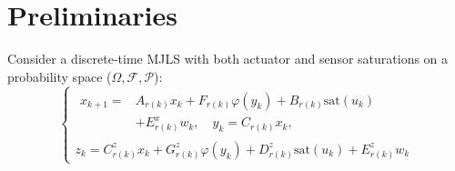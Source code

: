 \documentclass[conference]{IEEEtran}
\begin{document}
%






\section{Preliminaries}
Consider a discrete-time MJLS with both actuator and sensor saturations on a probability space ($\Omega,\mathcal{F},\mathcal{P}$):
\begin{equation}\label{syseq}
	\left\{
	\begin{array}{lr}
		\begin{split}
			x_{k+1}=&A_{r(k)}x_k+F_{r(k)}\varphi(y_k)+B_{r(k)}\mathrm{sat}(u_k) \\
			&+E^x_{r(k)}w_k, \quad y_k=C_{r(k)}x_k,
		\end{split}
		\\
		z_k=C^z_{r(k)}x_k+G^z_{r(k)}\varphi(y_k)+D^z_{r(k)}\mathrm{sat}(u_k)+E^z_{r(k)}w_k
	\end{array}
	\right.
\end{equation}
\end{document}
